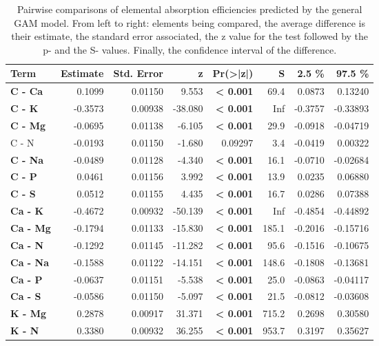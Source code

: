 \begin{table}[H]
\centering
\caption{\label{tab:table_pairs_i_ae}Pairwise comparisons of elemental absorption efficiencies predicted by the general GAM model. From left to right: elements being compared, the average difference is their estimate, the standard error associated, the z value for the test followed by the p- and the S- values. Finally, the confidence interval of the difference.}
\centering
\begin{tabular}[t]{>{}lrrr>{}rrrr}
\toprule
\textbf{Term} & \textbf{Estimate} & \textbf{Std. Error} & \textbf{z} & \textbf{Pr(>|z|)} & \textbf{S} & \textbf{2.5 \%} & \textbf{97.5 \%}\\
\midrule
\textbf{C - Ca} & 0.1099 & 0.01150 & 9.553 & \textbf{< 0.001} & 69.4 & 0.0873 & 0.13240\\
\textbf{C - K} & -0.3573 & 0.00938 & -38.080 & \textbf{< 0.001} & Inf & -0.3757 & -0.33893\\
\textbf{C - Mg} & -0.0695 & 0.01138 & -6.105 & \textbf{< 0.001} & 29.9 & -0.0918 & -0.04719\\
C - N & -0.0193 & 0.01150 & -1.680 & 0.09297 & 3.4 & -0.0419 & 0.00322\\
\textbf{C - Na} & -0.0489 & 0.01128 & -4.340 & \textbf{< 0.001} & 16.1 & -0.0710 & -0.02684\\
\textbf{C - P} & 0.0461 & 0.01156 & 3.992 & \textbf{< 0.001} & 13.9 & 0.0235 & 0.06880\\
\textbf{C - S} & 0.0512 & 0.01155 & 4.435 & \textbf{< 0.001} & 16.7 & 0.0286 & 0.07388\\
\textbf{Ca - K} & -0.4672 & 0.00932 & -50.139 & \textbf{< 0.001} & Inf & -0.4854 & -0.44892\\
\textbf{Ca - Mg} & -0.1794 & 0.01133 & -15.830 & \textbf{< 0.001} & 185.1 & -0.2016 & -0.15716\\
\textbf{Ca - N} & -0.1292 & 0.01145 & -11.282 & \textbf{< 0.001} & 95.6 & -0.1516 & -0.10675\\
\textbf{Ca - Na} & -0.1588 & 0.01122 & -14.151 & \textbf{< 0.001} & 148.6 & -0.1808 & -0.13681\\
\textbf{Ca - P} & -0.0637 & 0.01151 & -5.538 & \textbf{< 0.001} & 25.0 & -0.0863 & -0.04117\\
\textbf{Ca - S} & -0.0586 & 0.01150 & -5.097 & \textbf{< 0.001} & 21.5 & -0.0812 & -0.03608\\
\textbf{K - Mg} & 0.2878 & 0.00917 & 31.371 & \textbf{< 0.001} & 715.2 & 0.2698 & 0.30580\\
\textbf{K - N} & 0.3380 & 0.00932 & 36.255 & \textbf{< 0.001} & 953.7 & 0.3197 & 0.35627\\

\end{tabular}
\end{table}

